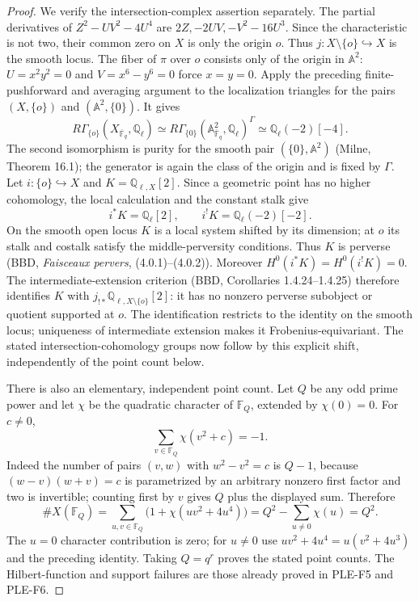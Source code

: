 \begin{proof}
We verify the intersection-complex assertion separately. The partial
derivatives of $Z^2-UV^2-4U^4$ are
$2Z,-2UV,-V^2-16U^3$. Since the characteristic is not two, their
common zero on $X$ is only the origin $o$. Thus
$j:X\setminus\{o\}\hookrightarrow X$ is the smooth locus.
The fiber of $\pi$ over $o$ consists only of the origin in $\mathbb A^2$:
$U=x^2y^2=0$ and $V=x^6-y^6=0$ force $x=y=0$.
Apply the preceding finite-pushforward and averaging argument to the
localization triangles for the pairs $(X,\{o\})$ and
$(\mathbb A^2,\{0\})$. It gives
\[
 R\Gamma_{\{o\}}(X_{\overline{\mathbb F}_q},\mathbb Q_\ell)
 \simeq
 R\Gamma_{\{0\}}(\mathbb A^2_{\overline{\mathbb F}_q},
                 \mathbb Q_\ell)^\Gamma
 \simeq \mathbb Q_\ell(-2)[-4].
\]
The second isomorphism is purity for the smooth pair
$(\{0\},\mathbb A^2)$ (Milne, Theorem 16.1); the generator is again
the class of the origin and is fixed by $\Gamma$.
Let $i:\{o\}\hookrightarrow X$ and $K=\mathbb Q_{\ell,X}[2]$.
Since a geometric point has no higher cohomology, the local calculation
and the constant stalk give
\[
 i^*K=\mathbb Q_\ell[2],\qquad
 i^!K=\mathbb Q_\ell(-2)[-2].
\]
On the smooth open locus $K$ is a local system shifted by its dimension;
at $o$ its stalk and costalk satisfy the middle-perversity conditions.
Thus $K$ is perverse (BBD, \emph{Faisceaux pervers},
(4.0.1)--(4.0.2)). Moreover $H^0(i^*K)=H^0(i^!K)=0$.
The intermediate-extension criterion (BBD, Corollaries 1.4.24--1.4.25)
therefore identifies $K$ with $j_{!*}\mathbb Q_{\ell,X\setminus\{o\}}[2]$:
it has no nonzero perverse subobject or quotient supported at $o$.
The identification restricts to the identity on the smooth locus;
uniqueness of intermediate extension makes it Frobenius-equivariant.
The stated intersection-cohomology groups now follow by this explicit
shift, independently of the point count below.

There is also an elementary, independent point count. Let $Q$ be any odd
prime power and let $\chi$ be the quadratic character of $\mathbb F_Q$,
extended by $\chi(0)=0$. For $c\ne0$,
\[
 \sum_{v\in\mathbb F_Q}\chi(v^2+c)=-1.
\]
Indeed the number of pairs $(v,w)$ with $w^2-v^2=c$ is $Q-1$,
because $(w-v)(w+v)=c$ is parametrized by an arbitrary nonzero first
factor and two is invertible; counting first by $v$ gives $Q$ plus the
displayed sum. Therefore
\[
 \#X(\mathbb F_Q)
 =\sum_{u,v\in\mathbb F_Q}\bigl(1+\chi(uv^2+4u^4)\bigr)
 =Q^2-\sum_{u\ne0}\chi(u)=Q^2.
\]
The $u=0$ character contribution is zero; for $u\ne0$ use
$uv^2+4u^4=u(v^2+4u^3)$ and the preceding identity. Taking $Q=q^r$
proves the stated point counts. The Hilbert-function and support
failures are those already proved in PLE-F5 and PLE-F6.
\end{proof}


